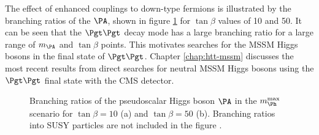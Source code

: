 The effect of enhanced couplings to down-type fermions is illustrated by the
branching ratios of the $\PA$, shown in figure \ref{fig:mhmaxBRs} for $\tan\beta$
values of 10 and 50. It can be seen that the $\Pgt\Pgt$ decay mode has a large
branching ratio for a large range of $m_{\PA}$ and $\tan\beta$ points. This
motivates searches for the \ac{MSSM} Higgs bosons in the final state of $\Pgt\Pgt$. 
Chapter \ref{chap:htt-mssm} discusses the most recent results 
from direct searches for neutral \ac{MSSM} Higgs bosons using the $\Pgt\Pgt$
final state with the CMS detector.

\begin{figure}[htbp]
\caption[Branching ratios of the pseudoscalar Higgs boson $\PA$ in the
$m_{\Ph}^{\text{max}}$ scenario.]{Branching ratios of the pseudoscalar Higgs boson $\PA$ in the
$m_{\Ph}^{\text{max}}$ scenario for $\tan\beta=10$ (a) and $\tan\beta=50$
(b). Branching ratios into \ac{SUSY} particles are not included in the figure \cite{Heinemeyer:2013tqa}.}
\label{fig:mhmaxBRs}
\end{figure}

